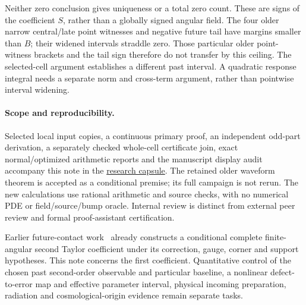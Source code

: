 \documentclass[10pt]{article}
\begin{document}
Neither zero conclusion gives uniqueness or a total zero count. These are
signs of the coefficient \(S\), rather than a globally signed angular field.
The four older narrow central/late point witnesses and negative future tail
have margins smaller than \(B\); their widened intervals straddle zero.
Those particular older point-witness brackets and the tail sign therefore
do not transfer by this ceiling. The selected-cell argument establishes a
different past interval. A quadratic response integral needs a separate norm and
cross-term argument, rather than pointwise interval widening.

\paragraph{Scope and reproducibility.}
Selected local input copies, a continuous primary proof, an independent
odd-part derivation, a separately checked whole-cell certificate join,
exact normal/optimized arithmetic reports and the
manuscript display audit accompany this note in the
\href{https://github.com/maldonado-research/HDblast/tree/main/research/HDBLAST_PAST_FUTURE_SCALAR_TRANSFER_20261104}{research capsule}.
The retained older waveform theorem is accepted as a conditional premise;
its full campaign is not rerun. The new calculations use rational arithmetic
and source checks, with no numerical PDE or field/source/bump oracle.
Internal review is distinct from external peer review and formal
proof-assistant certification.

Earlier future-contact work~\cite{second} already constructs a conditional complete
finite-angular second Taylor coefficient under its correction, gauge,
corner and support hypotheses. This note concerns the first coefficient.
Quantitative control of the chosen past second-order observable and
particular baseline, a nonlinear defect-to-error map and effective parameter
interval, physical incoming preparation, radiation and cosmological-origin
evidence remain separate tasks.
\end{document}
